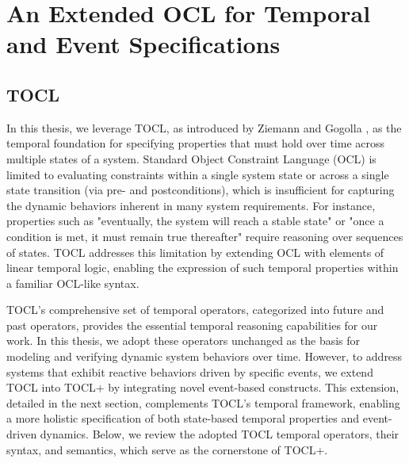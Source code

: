\section{An Extended OCL for Temporal and Event Specifications}

\subsection{TOCL}

\hspace{1cm} In this thesis, we leverage TOCL, as introduced by Ziemann and Gogolla \cite{TOCL}, 
as the temporal foundation for specifying properties that must hold over time across 
multiple states of a system. Standard Object Constraint Language (OCL) is limited to 
evaluating constraints within a single system state or across a single state transition 
(via pre- and postconditions), which is insufficient for capturing the dynamic behaviors 
inherent in many system requirements. For instance, properties such as "eventually, 
the system will reach a stable state" or "once a condition is met, it must remain 
true thereafter" require reasoning over sequences of states. TOCL addresses this limitation 
by extending OCL with elements of linear temporal logic, enabling the expression of such 
temporal properties within a familiar OCL-like syntax.

TOCL's comprehensive set of temporal operators, categorized into future and past 
operators, provides the essential temporal reasoning capabilities for our work. 
In this thesis, we adopt these operators unchanged as the basis for modeling and 
verifying dynamic system behaviors over time. However, to address systems that 
exhibit reactive behaviors driven by specific events, we extend TOCL into TOCL+ 
by integrating novel event-based constructs. This extension, detailed in the next 
section, complements TOCL’s temporal framework, enabling a more holistic specification 
of both state-based temporal properties and event-driven dynamics. Below, we review 
the adopted TOCL temporal operators, their syntax, and semantics, which serve as 
the cornerstone of TOCL+.


